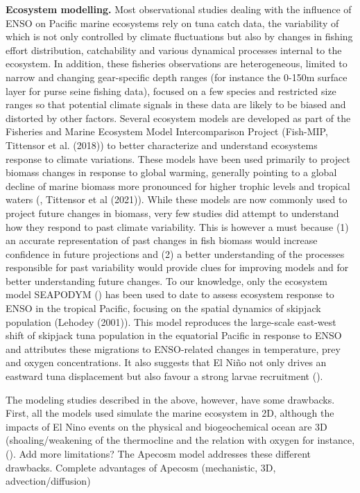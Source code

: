 \textbf{Ecosystem modelling.} Most observational studies dealing with the influence of ENSO on Pacific marine ecosystems rely on tuna catch data, the variability of which is not only controlled by climate fluctuations but also by changes in fishing effort distribution, catchability and various dynamical processes internal to the ecosystem. In addition, these fisheries observations are heterogeneous, limited to narrow and changing gear-specific depth ranges (for instance the 0-150m surface layer for purse seine fishing data), focused on a few species and restricted size ranges so that potential climate signals in these data are likely to be biased and distorted by other factors. Several ecosystem models are developed as part of the Fisheries and Marine Ecosystem Model Intercomparison Project (Fish-MIP, Tittensor et al. (2018)) to better characterize and understand ecosystems response to climate variations. These models have been used primarily to project biomass changes in response to global warming, generally pointing to a global decline of marine biomass more pronounced for higher trophic levels and tropical waters  (\cite{lotzeGlobalEnsembleProjections2019}, Tittensor et al (2021)). While these models are now commonly used to project future  changes in biomass, very few studies did attempt to understand how they respond to past climate variability. This is however a must because (1) an accurate representation of past  changes in fish biomass would increase confidence in future projections and (2) a better understanding of the processes responsible for past variability would provide clues for improving models and for better understanding future changes. To our knowledge, only the ecosystem model SEAPODYM (\cite{lehodeySpatialEcosystemPopulations2008}) has been used to date to assess ecosystem response to ENSO in the tropical Pacific, focusing on the spatial dynamics of skipjack population (Lehodey (2001)). This model reproduces the large-scale east-west shift of skipjack tuna population in the equatorial Pacific in response to ENSO and attributes these migrations to ENSO-related changes in temperature, prey and oxygen concentrations. It also suggests that El Niño not only drives an eastward tuna displacement but also favour a strong larvae recruitment (\cite{seninaParameterEstimationBasinscale2008}). 

The modeling studies described in the above, however, have some drawbacks. First, all the models used simulate the marine ecosystem in 2D, although the impacts of El Nino events on the physical and biogeochemical ocean are 3D (shoaling/weakening of the thermocline and the relation with oxygen for instance, (\cite{leungENSODrivesNearsurface2019}). Add more limitations? The Apecosm model addresses these different drawbacks. Complete advantages of Apecosm (mechanistic, 3D, advection/diffusion)

